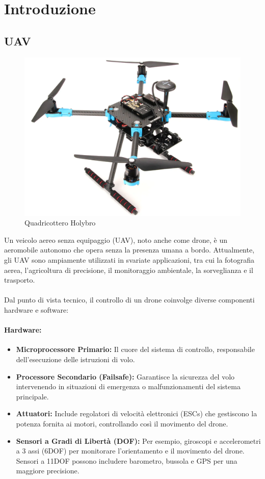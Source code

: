 \chapter{Introduzione}
\section{UAV}
\begin{figure}[h]
    \centering
    \includegraphics[width=0.7\linewidth]{files/drone.png}
    \caption{Quadricottero Holybro}
    \label{fig:enter-label}
\end{figure}
Un veicolo aereo senza equipaggio (UAV), noto anche come drone, è un aeromobile autonomo che opera senza la presenza umana a bordo. Attualmente, gli UAV sono ampiamente utilizzati in svariate applicazioni, tra cui la fotografia aerea, l'agricoltura di precisione, il monitoraggio ambientale, la sorveglianza e il trasporto.
\\~\\
Dal punto di vista tecnico, il controllo di un drone coinvolge diverse componenti hardware e software:
\subsubsection*{Hardware:}
\begin{itemize}
    \item \textbf{Microprocessore Primario:} Il cuore del sistema di controllo, responsabile dell'esecuzione delle istruzioni di volo.
    \item \textbf{Processore Secondario (Failsafe):} Garantisce la sicurezza del volo intervenendo in situazioni di emergenza o malfunzionamenti del sistema principale.
    \item \textbf{Attuatori:} Include regolatori di velocità elettronici (ESCs) che gestiscono la potenza fornita ai motori, controllando così il movimento del drone.
    \item \textbf{Sensori a Gradi di Libertà (DOF):} Per esempio, giroscopi e accelerometri a 3 assi (6DOF) per monitorare l'orientamento e il movimento del drone. Sensori a 11DOF possono includere barometro, bussola e GPS per una maggiore precisione.
\end{itemize}

